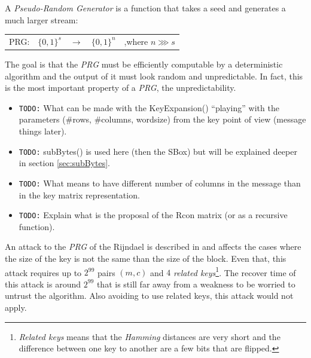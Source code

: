 \documentclass[10pt,a4paper,twoside]{llncs}
\begin{document}
\begin{definition}\label{def:PRG}
 A \emph{Pseudo-Random Generator} is a function that takes a seed and generates a much larger stream:
 \begin{center}
  \begin{tabular}{llllr}
   PRG: & $\{0,1\}^{s}$ & $\rightarrow$ & $\{0,1\}^n$ & ,where $n \ggg s$\\
  \end{tabular}
 \end{center}
 
\end{definition}
The goal is that the \emph{PRG} must be efficiently computable by a deterministic algorithm and the output of it must look random and unpredictable. In fact, this is the most important property of a \emph{PRG}, the unpredictability.

\begin{itemize}
 \item \texttt{TODO:} What can be made with the KeyExpansion() ``playing'' with the parameters (\#rows, \#columns, wordsize) from the key point of view (message things later).
 \item \texttt{TODO:} subBytes() is used here (then the SBox) but will be explained deeper in section \ref{sec:subBytes}.
 \item \texttt{TODO:} What means to have different number of columns in the message than in the key matrix representation.
 \item \texttt{TODO:} Explain what is the proposal of the Rcon matrix (or as a recursive function).
\end{itemize}

An attack to the \emph{PRG} of the Rijndael is described in \cite{fullaes-192-256} and affects the cases where the size of the key is not the same than the size of the block. Even that, this attack requires up to $2^{99}$ pairs $(m,c)$ and $4$ \emph{related keys}\footnote{\emph{Related keys} means that the \emph{Hamming} distances are very short and the difference between one key to another are a few bits that are flipped.}. The recover time of this attack is around $2^{99}$ that is still far away from a weakness to be worried to untrust the algorithm. Also avoiding to use related keys, this attack would not apply.
\end{document}
